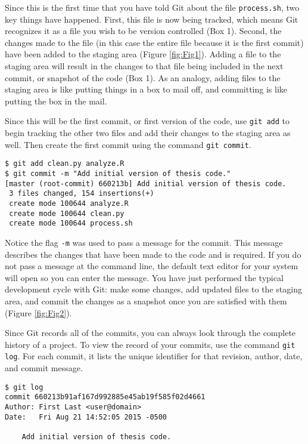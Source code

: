 Since this is the first time that you have told Git about the file \verb|process.sh|, two key things have happened.
First, this file is now being tracked, which means Git recognizes it as a file you wish to be version controlled (Box 1).
Second, the changes made to the file (in this case the entire file because it is the first commit) have been added to the staging area (Figure \ref{fig:Fig1}).
Adding a file to the staging area will result in the changes to that file being included in the next commit, or snapshot of the code (Box 1).
As an analogy, adding files to the staging area is like putting things in a box to mail off, and committing is like putting the box in the mail.

Since this will be the first commit, or first version of the code, use \verb|git add| to begin tracking the other two files and add their changes to the staging area as well.
Then create the first commit using the command \verb|git commit|.

\begin{verbatim}
$ git add clean.py analyze.R
$ git commit -m "Add initial version of thesis code."
[master (root-commit) 660213b] Add initial version of thesis code.
 3 files changed, 154 insertions(+)
 create mode 100644 analyze.R
 create mode 100644 clean.py
 create mode 100644 process.sh
\end{verbatim}

Notice the flag \verb|-m| was used to pass a message for the commit.
This message describes the changes that have been made to the code and is required.
If you do not pass a message at the command line, the default text editor for your system will open so you can enter the message.
You have just performed the typical development cycle with Git:
make some changes, add updated files to the staging area, and commit the changes as a snapshot once you are satisfied with them (Figure \ref{fig:Fig2}).

Since Git records all of the commits, you can always look through the complete history of a project.
To view the record of your commits, use the command \verb|git log|.
For each commit, it lists the unique identifier for that revision, author, date, and commit message.

\begin{verbatim}
$ git log
commit 660213b91af167d992885e45ab19f585f02d4661
Author: First Last <user@domain>
Date:   Fri Aug 21 14:52:05 2015 -0500

    Add initial version of thesis code.
\end{verbatim}

